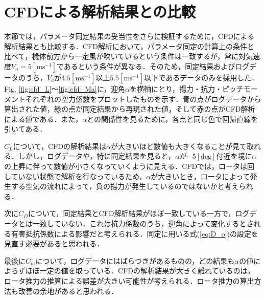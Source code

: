 \section{CFDによる解析結果との比較}
\label{sec:cfd}

本節では，パラメータ同定結果の妥当性をさらに検証するために，CFDによる解析結果とも比較する．CFD解析において，パラメータ同定の計算上の条件と比べて，機体前方から一定風が吹いているという条件は一致するが，常に対気速度$V_a=5\mathrm{[m s^{-1}]}$であるという条件が異なる．そのため，同定結果およびログデータのうち，$V_a$が$4.5\mathrm{[m s^{-1}]}$以上$5.5\mathrm{[m s^{-1}]}$以下であるデータのみを採用した．Fig. \ref{fig:cfd_L}〜\ref{fig:cfd_Ma}に，迎角$\alpha$を横軸にとり，揚力・抗力・ピッチモーメントそれぞれの空力係数をプロットしたものを示す．青の点がログデータから算出された値，緑の点が同定結果から再現された値，そして赤の点がCFD解析による値である．また，$\alpha$との関係性を見るために，各点と同じ色で回帰直線を引いてある．

$C_L$について，CFDの解析結果は$\alpha$が大きいほど数値も大きくなることが見て取れる．しかし，ログデータや，特に同定結果を見ると，$\alpha$が$-5\mathrm{[deg]}$付近を境に$\alpha$の上昇に伴って数値が小さくなっていくように見える．CFDでは，ロータは回していない状態で解析を行なっているため，$\alpha$が大きいとき，ロータによって発生する空気の流れによって，負の揚力が発生しているのではないかと考えられる．

次に$C_D$について，同定結果とCFD解析結果がほぼ一致している一方で，ログデータとは一致していない．これは抗力係数のうち，迎角によって変化するとされる有害抵抗係数による影響だと考えられる\cite{katou}．同定に用いる式(\ref{eq:D_o})の設定を見直す必要があると思われる．

最後に$C_m$について，ログデータにはばらつきがあるものの，どの結果も$\alpha$の値によらずほぼ一定の値を取っている．CFDの解析結果が大きく離れているのは，ロータ推力の推算による誤差が大きい可能性が考えられる．ロータ推力の算出方法も改善の余地があると思われる．

